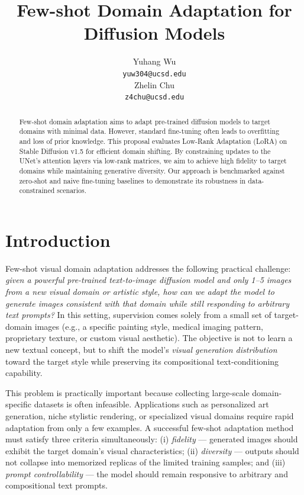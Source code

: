 \documentclass{article}
\title{Few-shot Domain Adaptation for Diffusion Models}
\author{%
  Yuhang Wu \\
  \texttt{yuw304@ucsd.edu} \\
  \And
  Zhelin Chu \\
  \texttt{z4chu@ucsd.edu} \\
}
\begin{document}
\maketitle


\begin{abstract} Few-shot domain adaptation aims to adapt pre-trained diffusion models to target domains with minimal data. However, standard fine-tuning often leads to overfitting and loss of prior knowledge. This proposal evaluates Low-Rank Adaptation (LoRA) on Stable Diffusion v1.5 for efficient domain shifting. By constraining updates to the UNet's attention layers via low-rank matrices, we aim to achieve high fidelity to target domains while maintaining generative diversity. Our approach is benchmarked against zero-shot and naive fine-tuning baselines to demonstrate its robustness in data-constrained scenarios. \end{abstract}

\section{Introduction}

Few-shot visual domain adaptation addresses the following practical challenge: 
\emph{given a powerful pre-trained text-to-image diffusion model and only 1--5 images from a new visual domain or artistic style, how can we adapt the model to generate images consistent with that domain while still responding to arbitrary text prompts?} 
In this setting, supervision comes solely from a small set of target-domain images (e.g., a specific painting style, medical imaging pattern, proprietary texture, or custom visual aesthetic). The objective is not to learn a new textual concept, but to shift the model's \emph{visual generation distribution} toward the target style while preserving its compositional text-conditioning capability.

This problem is practically important because collecting large-scale domain-specific datasets is often infeasible. Applications such as personalized art generation, niche stylistic rendering, or specialized visual domains require rapid adaptation from only a few examples. A successful few-shot adaptation method must satisfy three criteria simultaneously: 
(i) \textit{fidelity} — generated images should exhibit the target domain's visual characteristics; 
(ii) \textit{diversity} — outputs should not collapse into memorized replicas of the limited training samples; and 
(iii) \textit{prompt controllability} — the model should remain responsive to arbitrary and compositional text prompts.
\end{document}
